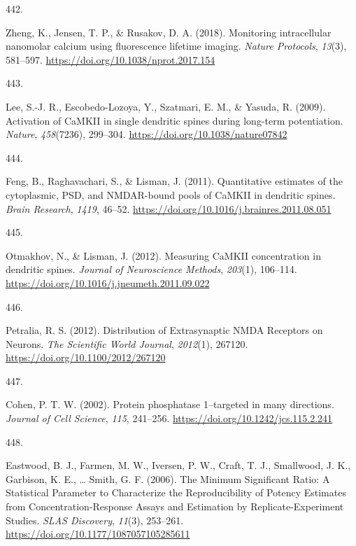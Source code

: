 \documentclass[
  11pt,
  letterpaper,
]{scrreprt}
\newlength{\cslhangindent}
\newlength{\csllabelwidth}
\newenvironment{CSLReferences}[2] %
 {\begin{list}{}{%
  \setlength{\itemindent}{0pt}
  \setlength{\leftmargin}{0pt}
  \setlength{\parsep}{0pt}
  \ifodd #1
   \setlength{\leftmargin}{\cslhangindent}
   \setlength{\itemindent}{-1\cslhangindent}
  \fi
  \setlength{\itemsep}{#2\baselineskip}}}
 {\end{list}}
\newcommand{\CSLLeftMargin}[1]{\parbox[t]{\csllabelwidth}{\strut#1\strut}}
\newcommand{\CSLRightInline}[1]{\parbox[t]{\linewidth - \csllabelwidth}{\strut#1\strut}}
\begin{document}
\begin{CSLReferences}{0}{0}
\CSLLeftMargin{442. }%
\CSLRightInline{Zheng, K., Jensen, T. P., \& Rusakov, D. A. (2018).
Monitoring intracellular nanomolar calcium using fluorescence lifetime
imaging. \emph{Nature Protocols}, \emph{13}(3), 581--597.
\url{https://doi.org/10.1038/nprot.2017.154}}

\CSLLeftMargin{443. }%
\CSLRightInline{Lee, S.-J. R., Escobedo-Lozoya, Y., Szatmari, E. M., \&
Yasuda, R. (2009). Activation of {CaMKII} in single dendritic spines
during long-term potentiation. \emph{Nature}, \emph{458}(7236),
299--304. \url{https://doi.org/10.1038/nature07842}}

\CSLLeftMargin{444. }%
\CSLRightInline{Feng, B., Raghavachari, S., \& Lisman, J. (2011).
Quantitative estimates of the cytoplasmic, {PSD}, and {NMDAR-bound}
pools of {CaMKII} in dendritic spines. \emph{Brain Research},
\emph{1419}, 46--52.
\url{https://doi.org/10.1016/j.brainres.2011.08.051}}

\CSLLeftMargin{445. }%
\CSLRightInline{Otmakhov, N., \& Lisman, J. (2012). Measuring {CaMKII}
concentration in dendritic spines. \emph{Journal of Neuroscience
Methods}, \emph{203}(1), 106--114.
\url{https://doi.org/10.1016/j.jneumeth.2011.09.022}}

\CSLLeftMargin{446. }%
\CSLRightInline{Petralia, R. S. (2012). Distribution of {Extrasynaptic
NMDA Receptors} on {Neurons}. \emph{The Scientific World Journal},
\emph{2012}(1), 267120. \url{https://doi.org/10.1100/2012/267120}}

\CSLLeftMargin{447. }%
\CSLRightInline{Cohen, P. T. W. (2002). Protein phosphatase 1--targeted
in many directions. \emph{Journal of Cell Science}, \emph{115},
241--256. \url{https://doi.org/10.1242/jcs.115.2.241}}

\CSLLeftMargin{448. }%
\CSLRightInline{Eastwood, B. J., Farmen, M. W., Iversen, P. W., Craft,
T. J., Smallwood, J. K., Garbison, K. E., \ldots{} Smith, G. F. (2006).
The {Minimum Significant Ratio}: {A Statistical Parameter} to
{Characterize} the {Reproducibility} of {Potency Estimates} from
{Concentration-Response Assays} and {Estimation} by
{Replicate-Experiment Studies}. \emph{SLAS Discovery}, \emph{11}(3),
253--261. \url{https://doi.org/10.1177/1087057105285611}}


\end{CSLReferences}
\end{document}
